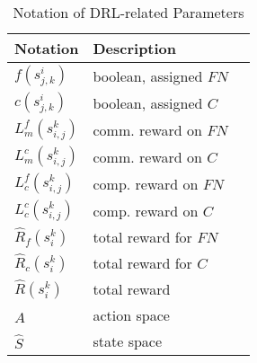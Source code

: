 \begin{table}[!ht]
    \centering
    \caption{Notation of DRL-related Parameters}
    \begin{tabular}{| l | l | l |}
        \hline
        \bf{Notation} & \bf{Description} \\
        \hline
        $f(s^i_{j,k})$ & boolean, assigned $FN$ \\
        \hline   
        $c(s^i_{j,k})$ & boolean, assigned $C$ \\
        \hline   
        $L_m^f(s^k_{i,j})$ & comm. reward on $FN$ \\
        \hline   
        $L_m^c(s^k_{i,j})$ & comm. reward on $C$ \\
        \hline   
        $L_c^f(s^k_{i,j})$ & comp. reward on $FN$ \\
        \hline   
        $L_c^c(s^k_{i,j})$ & comp. reward on $C$ \\
        \hline   
        $\hat{R}_f(s^k_i)$ & total reward for $FN$ \\
        \hline   
        $\hat{R}_c(s^k_i)$ & total reward for $C$ \\
        \hline   
        $\hat{R}(s^k_i)$ & total reward \\
        \hline   
        $\hat{A}$ & action space \\
        \hline   
        $\hat{S}$ & state space \\
        \hline   
    \end{tabular}
    \label{tab:drl}
    \end{table}
